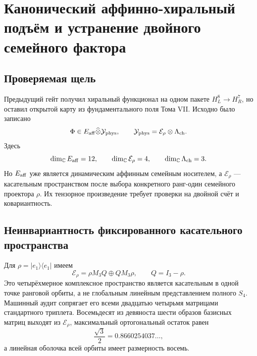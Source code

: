 \chapter{Канонический аффинно-хиральный подъём и устранение двойного семейного фактора}

\section{Проверяемая щель}

Предыдущий гейт получил хиральный функционал на одном пакете
$H_L^8\to H_R^7$, но оставил открытой карту из фундаментального поля Тома VII.
Исходно было записано
\begin{equation}
 \Phi\in E_{\rm aff}\widehat\otimes\mathcal Y_{\rm phys},
 \qquad
 \mathcal Y_{\rm phys}=\mathcal E_\rho\otimes\Lambda_{\rm ch}.
 \label{eq:v7-original-double-family-carrier}
\end{equation}
Здесь
\begin{equation}
 \dim_{\mathbb C}E_{\rm aff}=12,
 \qquad
 \dim_{\mathbb C}\mathcal E_\rho=4,
 \qquad
 \dim_{\mathbb C}\Lambda_{\rm ch}=3.
\end{equation}
Но $E_{\rm aff}$ уже является динамическим аффинным семейным носителем, а
$\mathcal E_\rho$ --- касательным пространством после выбора конкретного
ранг-один семейного проектора $\rho$. Их тензорное произведение требует
проверки на двойной счёт и ковариантность.

\section{Неинвариантность фиксированного касательного пространства}

Для $\rho=|e_1\rangle\langle e_1|$ имеем
\begin{equation}
 \mathcal E_\rho
 =\rho M_3Q\oplus QM_3\rho,
 \qquad Q=I_3-\rho.
 \label{eq:v7-fixed-rho-tangent}
\end{equation}
Это четырёхмерное комплексное пространство является касательным в одной
точке ранговой орбиты, а не глобальным линейным представлением полного
$S_4$. Машинный аудит сопрягает его всеми двадцатью четырьмя матрицами
стандартного триплета. Восемьдесят из девяноста шести образов базисных
матриц выходят из $\mathcal E_\rho$, максимальный ортогональный остаток равен
\begin{equation}
 \frac{\sqrt3}{2}=0.8660254037\ldots,
\end{equation}
а линейная оболочка всей орбиты имеет размерность восемь.

